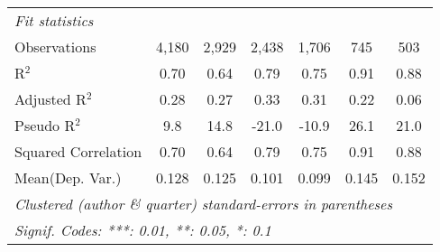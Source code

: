 \begin{tabular}{lcccccc}
   \midrule
   \emph{Fit statistics}\\
   Observations                                               & 4,180       & 2,929        & 2,438       & 1,706        & 745            & 503\\  
   R$^2$                                                      & 0.70        & 0.64         & 0.79        & 0.75         & 0.91           & 0.88\\  
   Adjusted R$^2$                                             & 0.28        & 0.27         & 0.33        & 0.31         & 0.22           & 0.06\\  
   Pseudo R$^2$                                               & 9.8         & 14.8         & -21.0       & -10.9        & 26.1           & 21.0\\  
   Squared Correlation                                        & 0.70        & 0.64         & 0.79        & 0.75         & 0.91           & 0.88\\  
Mean(Dep. Var.) & 0.128 & 0.125 & 0.101 & 0.099 & 0.145 & 0.152 \\
   \midrule \midrule
   \multicolumn{7}{l}{\emph{Clustered (author \& quarter) standard-errors in parentheses}}\\
   \multicolumn{7}{l}{\emph{Signif. Codes: ***: 0.01, **: 0.05, *: 0.1}}\\
\end{tabular}
\par\endgroup
